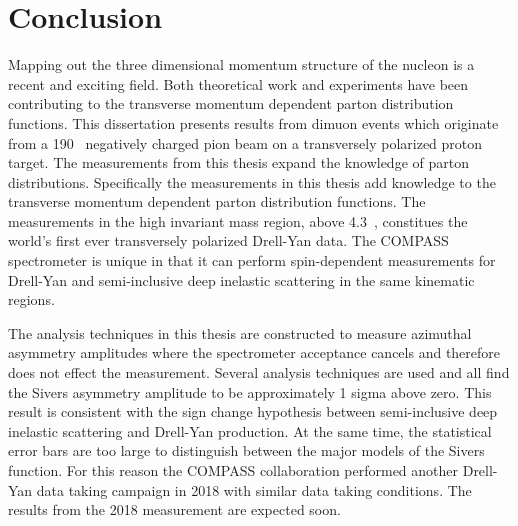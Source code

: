 \chapter{Conclusion}
\label{ch::conclusion}

Mapping out the three dimensional momentum structure of the nucleon is a recent
and exciting field.  Both theoretical work and experiments have been
contributing to the transverse momentum dependent parton distribution functions.
This dissertation presents results from dimuon events which originate from a
190~{\gvc} negatively charged pion beam on a transversely polarized proton
target.  The measurements from this thesis expand the knowledge of parton
distributions.  Specifically the measurements in this thesis add knowledge to
the transverse momentum dependent parton distribution functions.  The
measurements in the high invariant mass region, above 4.3~{\gvcw}, constitues
the world's first ever transversely polarized Drell-Yan data.  The COMPASS
spectrometer is unique in that it can perform spin-dependent measurements for
Drell-Yan and semi-inclusive deep inelastic scattering in the same kinematic
regions.

The analysis techniques in this thesis are constructed to measure azimuthal
asymmetry amplitudes where the spectrometer acceptance cancels and therefore
does not effect the measurement.  Several analysis techniques are used and all
find the Sivers asymmetry amplitude to be approximately 1 sigma above zero.
This result is consistent with the sign change hypothesis between semi-inclusive
deep inelastic scattering and Drell-Yan production.  At the same time, the
statistical error bars are too large to distinguish between the major models of
the Sivers function.  For this reason the COMPASS collaboration performed
another Drell-Yan data taking campaign in 2018 with similar data taking
conditions.  The results from the 2018 measurement are expected soon.
